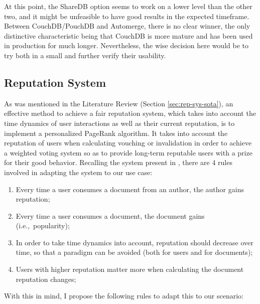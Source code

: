 At this point, the ShareDB option seems to work on a lower level than the other two, and it might be unfeasible to have good results in the expected timeframe. Between CouchDB/PouchDB and Automerge, there is no clear winner, the only distinctive characteristic being that CouchDB is more mature and has been used in production for much longer. Nevertheless, the wise decision here would be to try both in a small  and further verify their usability. 

\subsection{Reputation System} \label{sec:problem-solution-rep-sys}
As was mentioned in the Literature Review (Section \ref{sec:rep-sys-sota}), an effective method to achieve a fair reputation system, which takes into account the time dynamics of user interactions as well as their current reputation, is to implement a personalized PageRank algorithm. It takes into account the reputation of users when calculating vouching or invalidation in order to achieve a weighted voting system so as to provide long-term reputable users with a prize for their good behavior. Recalling the system present in \cite{Daly2009}, there are 4 rules involved in adapting the system to our use case:

\begin{enumerate}
    \item Every time a user consumes a document from an author, the author gains reputation;
    \item Every time a user consumes a document, the document gains  (i.e.,\ popularity);
    \item In order to take time dynamics into account, reputation should decrease over time, so that a  paradigm can be avoided (both for users and for documents);
    \item Users with higher reputation matter more when calculating the document reputation changes;
\end{enumerate}

With this in mind, I propose the following rules to adapt this to our scenario:


